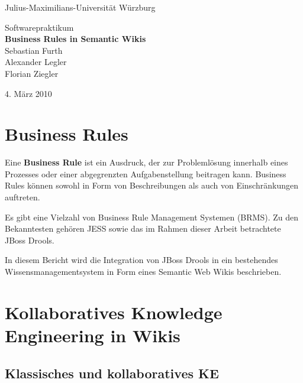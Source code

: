 \documentclass[a4paper,12pt]{report}
\begin{document}
  
  \begin{titlepage}    
    \begin{center}
      \large{Julius-Maximilians-Universität Würzburg}
      
      \vspace{5cm}
      
      \huge{Softwarepraktikum}\\[1cm]
      \huge{\textbf{Business Rules in Semantic Wikis}}\\[2cm]
      
      \LARGE{
        Sebastian Furth\\[.25cm]
        Alexander Legler\\[.25cm]
        Florian Ziegler\\[.25cm]
      }
      
      \vspace{3cm}
      4. März 2010
    \end{center}
  \end{titlepage}
  
  
  \tableofcontents
  
  \parindent 0pt
  \parskip 9pt
  
  \chapter{Business Rules}

Eine \textbf{Business Rule} ist ein Ausdruck, der zur Problemlösung innerhalb eines Prozesses oder
einer abgegrenzten Aufgabenstellung beitragen kann. Business Rules können sowohl in Form von 
Beschreibungen als auch von Einschränkungen auftreten. 

Es gibt eine Vielzahl von Business Rule Management Systemen (BRMS). Zu den Bekanntesten gehören
JESS sowie das im Rahmen dieser Arbeit betrachtete JBoss Drools.

In diesem Bericht wird die Integration von JBoss Drools in ein bestehendes Wissensmanagementsystem
in Form eines Semantic Web Wikis beschrieben.

  \chapter{Kollaboratives Knowledge Engineering in Wikis}
  
  \section{Klassisches und kollaboratives KE}
\end{document}
